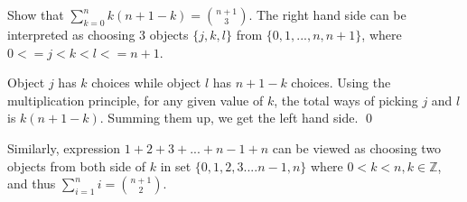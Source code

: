 \begin{exec}{}{}
  Show that $\sum_{k=0}^{n} k(n+1-k)={n+1 \choose 3}$.
  \tcblower
  The right hand side can be interpreted as choosing 3 objects $\{j,k,l\}$ from $\{0,1,...,n,n+1\}$, where $0<=j<k<l<=n+1$.

  Object $j$ has $k$ choices while object $l$ has $n+1-k$ choices. Using the multiplication principle, for any given value of $k$, the total ways of picking $j$ and $l$ is $k(n+1-k)$. Summing them up, we get the left hand side.
  \qed

  Similarly, expression $1+2+3+...+n-1+n$ can be viewed as choosing two objects from both side of $k$ in set $\{0,1,2,3....n-1,n\}$ where $0<k<n, k \in \mathbb{Z}$, and thus $\sum_{i=1}^{n}i={n+1 \choose 2}$.
\end{exec}
